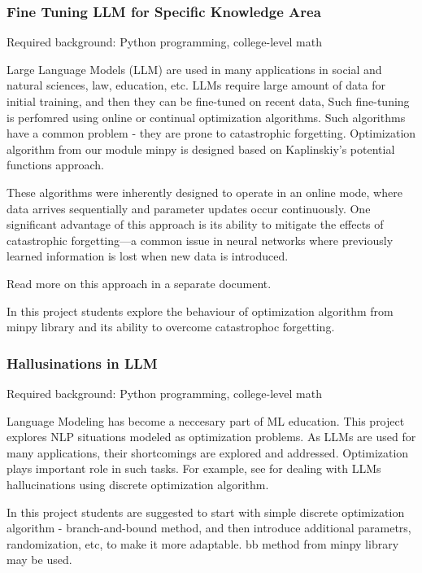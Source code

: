 \documentclass{article} %
\begin{document}
\subsubsection{Fine Tuning  LLM for Specific Knowledge Area}


Required background: Python programming, college-level math

Large Language Models (LLM) are used in many applications in social and natural sciences, law, education, etc. LLMs require large amount of data for initial training, and then they can be fine-tuned on recent data, Such fine-tuning is perfomred using online or continual optimization algorithms. Such algorithms have a common problem - they are prone to catastrophic forgetting.  Optimization algorithm from our module minpy is designed based on Kaplinskiy's potential functions approach.

These algorithms were inherently designed to operate in an online mode, where data arrives sequentially and parameter updates occur continuously. One significant advantage of this approach is its ability to mitigate the effects of catastrophic forgetting—a common issue in neural networks where previously learned information is lost when new data is introduced.


Read more on this approach in a separate document.

In this project students explore the behaviour of optimization algorithm from minpy library and its ability to overcome catastrophoc forgetting. 

\subsubsection{Hallusinations in LLM}


Required background: Python programming, college-level math

Language Modeling has become a neccesary part of ML education.  This project explores NLP situations modeled as optimization problems. As LLMs are used for many applications, their shortcomings are explored and addressed.  Optimization plays important role in such tasks. For example, see  \cite{JDRJ} for dealing with LLMs hallucinations using discrete optimization algorithm. 

In this project students are suggested to start with simple discrete optimization algorithm - branch-and-bound method, and then introduce additional parametrs, randomization, etc, to make it  more adaptable. bb method from minpy library may be used.
\end{document}
